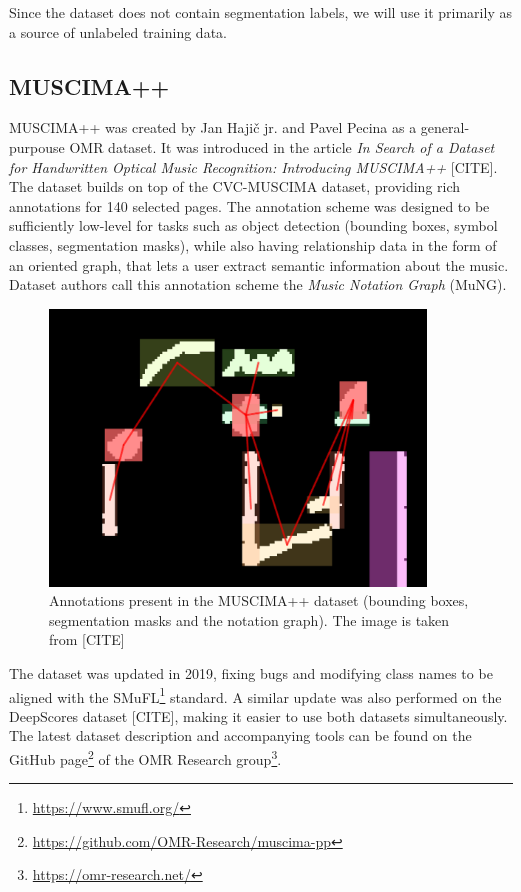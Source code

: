 Since the dataset does not contain segmentation labels, we will use it primarily as a source of unlabeled training data.


\subsection{MUSCIMA++}

MUSCIMA++ was created by Jan Hajič jr. and Pavel Pecina as a general-purpouse OMR dataset. It was introduced in the article \emph{In Search of a Dataset for Handwritten Optical Music Recognition: Introducing MUSCIMA++} [CITE]. The dataset builds on top of the CVC-MUSCIMA dataset, providing rich annotations for 140 selected pages. The annotation scheme was designed to be sufficiently low-level for tasks such as object detection (bounding boxes, symbol classes, segmentation masks), while also having relationship data in the form of an oriented graph, that lets a user extract semantic information about the music. Dataset authors call this annotation scheme the \emph{Music Notation Graph} (MuNG).

\begin{figure}[ht]
    \centering
    \includegraphics[width=100mm]{../img/muscima-pp.png}
    \caption{Annotations present in the MUSCIMA++ dataset (bounding boxes, segmentation masks and the notation graph). The image is taken from [CITE]}
    \label{fig:MuscimaPP}
\end{figure}

The dataset was updated in 2019, fixing bugs and modifying class names to be aligned with the SMuFL\footnote{\url{https://www.smufl.org/}} standard. A similar update was also performed on the DeepScores dataset [CITE], making it easier to use both datasets simultaneously. The latest dataset description and accompanying tools can be found on the GitHub page\footnote{\url{https://github.com/OMR-Research/muscima-pp}} of the OMR Research group\footnote{\url{https://omr-research.net/}}.

